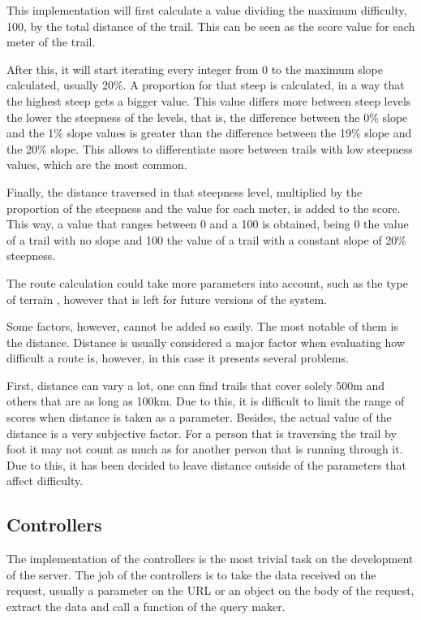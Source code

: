 This implementation will first calculate a value dividing the maximum difficulty, 100, by the total distance of the trail. This can be seen as the score value for each meter of the trail.

After this, it will start iterating every integer from 0 to the maximum slope calculated, usually 20\%. A proportion for that steep is calculated, in a way that the highest steep gets a bigger value. This value differs more between steep levels the lower the steepness of the levels, that is, the difference between the 0\% slope and the 1\% slope values is greater than the difference between the 19\% slope and the 20\% slope. This allows to differentiate more between trails with low steepness values, which are the most common.

Finally, the distance traversed in that steepness level, multiplied by the proportion of the steepness and the value for each meter, is added to the score. This way, a value that ranges between 0 and a 100 is obtained, being 0 the value of a trail with no slope and 100 the value of a trail with a constant slope of 20\% steepness.

The route calculation could take more parameters into account, such as the type of terrain , however that is left for future versions of the system.

Some factors, however, cannot be added so easily. The most notable of them is the distance. Distance is usually considered a major factor when evaluating how difficult a route is, however, in this case it presents several problems. 

First, distance can vary a lot, one can find trails that cover solely 500m and others that are as long as 100km. Due to this, it is difficult to limit the range of scores when distance is taken as a parameter. Besides, the actual value of the distance is a very subjective factor. For a person that is traversing the trail by foot it may not count as much as for another person that is running through it. Due to this, it has been decided to leave distance outside of the parameters that affect difficulty.

\subsection{Controllers}

The implementation of the controllers is the most trivial task on the development of the server. The job of the controllers is to take the data received on the request, usually a parameter on the URL or an object on the body of the request, extract the data and call a function of the query maker.

